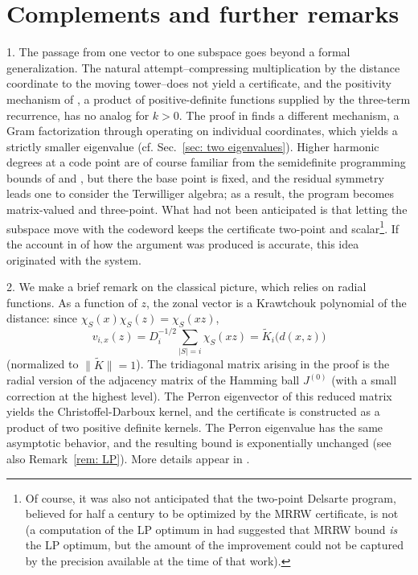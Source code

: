 \documentclass[11pt]{amsart}
\theoremstyle{plain}
\theoremstyle{remark}
\newcommand{\Kt}{\tilde K}
\begin{document}
\section{Complements and further remarks}\label{sec: complements}

1. The passage from one vector to one subspace goes beyond a formal generalization. The natural attempt--compressing multiplication by the distance coordinate to the moving tower--does not yield a certificate, and the positivity mechanism of \cite{BN08}, a product of positive-definite functions supplied by the three-term recurrence, has no analog for $k>0$. The proof in \cite{OAI26} finds a different mechanism, a Gram factorization through operating on individual coordinates, which yields a strictly smaller eigenvalue (cf. Sec.~\ref{sec: two eigenvalues}). Higher harmonic degrees at a code point are of course familiar from the semidefinite programming bounds of  \cite{Schrijver05} and \cite{BachocVallentin08}, but there the base point is fixed, and the residual symmetry leads one to consider the Terwilliger algebra; as a result, the program becomes matrix-valued and three-point. What had not been anticipated is that letting the subspace move with the codeword keeps the certificate two-point and scalar\footnote{Of course, it was also not anticipated that the two-point Delsarte program, believed for half a century to be optimized by the MRRW certificate, is not (a computation of the LP optimum in \cite{BJ01} had suggested that MRRW bound {\em is} the LP optimum, but the amount of the improvement could not be captured by the precision available at the time of that work).}. If the account in \cite{OAI26} of how the argument was produced is accurate, this idea originated with the system.


2. We make a brief remark on the classical picture, which relies on radial functions. As a function of $z$, the zonal vector is a Krawtchouk polynomial of the
distance: since $\chi_S(x)\chi_S(z)=\chi_S(xz)$,
\[
 v_{i,x}(z)=D_i^{-1/2}\sum_{|S|=i}\chi_S(xz)=\Kt_i\bigl(d(x,z)\bigr)
\]
(normalized to $\|\Kt\|=1$). The tridiagonal matrix arising in the proof is the radial
version of the adjacency matrix of the Hamming ball $J^{(0)}$ (with a small correction at the highest level). The Perron eigenvector of this reduced matrix yields the Christoffel-Darboux kernel, and the certificate is constructed as a product of two positive definite kernels. The Perron eigenvalue has the same asymptotic behavior, and the resulting bound is exponentially unchanged (see also Remark~\ref{rem: LP}). More details appear in \cite{BN06}.
\end{document}
